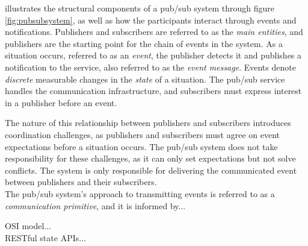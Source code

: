 \documentclass[../report.tex]{subfiles}
\begin{document}
\cite{tarkoma2012publish} illustrates the structural components of a pub/sub system through figure \ref{fig:pubsubsystem}, as well as how the participants interact through events and notifications. Publishers and subscribers are referred to as the \textit{main entities}, and publishers are the starting point for the chain of events in the system. As a situation occurs, referred to as an \textit{event}, the publisher detects it and publishes a notification to the service, also referred to as the \textit{event message}. Events denote \textit{discrete} measurable changes in the \textit{state} of a situation. The pub/sub service handles the communication infrastructure, and subscribers must express interest in a publisher before an event.

The nature of this relationship between publishers and subscribers introduces coordination challenges, as publishers and subscribers must agree on event expectations before a situation occurs. The pub/sub system does not take responsibility for these challenges, as it can only set expectations but not solve conflicts. The system is only responsible for delivering the communicated event between publishers and their subscribers. \\

The pub/sub system's approach to transmitting events is referred to as a \textit{communication primitive}, and it is informed by...

OSI model... \\

RESTful state APIs... \\


\end{document}
